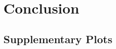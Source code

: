 \documentclass{article}\usepackage[]{graphicx}\usepackage[]{color}
\begin{document}
\section{Conclusion} \label{conclusion}



\newpage
\begin{appendices}

\section{Supplementary Plots} \label{appendix_plots}

\end{appendices}
\end{document}
